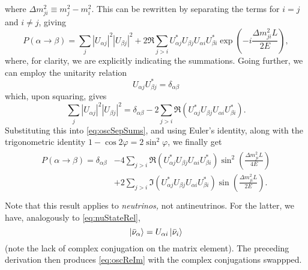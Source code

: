 \documentclass[../thesis.tex]{subfiles}
\begin{document}
where \(\Delta m^2_{ji} \equiv m^2_j - m^2_i\). This can be rewritten by separating the terms for \(i = j\) and \(i \neq j\), giving
\begin{equation}
  \label{eq:oscSepSums}
  P(\alpha \rightarrow \beta) = \sum_{j} |U_{\alpha j}|^2 |U_{\beta j}|^2
  + 2 \Re \sum_{j>i} U^*_{\alpha j} U_{\beta j} U_{\alpha i} U^*_{\beta i}
  \exp\left( -i \frac{\Delta m^2_{ji}L}{2E} \right),
\end{equation}
where, for clarity, we are explicitly indicating the summations. Going further, we can employ the unitarity relation
\begin{equation*}
  U_{\alpha j} U^*_{\beta j} = \delta_{\alpha \beta}
\end{equation*}
which, upon squaring, gives
\begin{equation*}
  \sum_j |U_{\alpha j}|^2 |U_{\beta j}|^2 = \delta_{\alpha \beta}
  - 2 \sum_{j > i} \Re(U^*_{\alpha j} U_{\beta j} U_{\alpha i} U^*_{\beta i}).
\end{equation*}
Substituting this into \eqref{eq:oscSepSums}, and using Euler's identity, along with the trigonometric identity \(1 - \cos 2\varphi = 2\sin^2 \varphi\), we finally get
\begin{align}
  \label{eq:oscReIm}
  \begin{split}
    P(\alpha \rightarrow \beta) = \delta_{\alpha \beta} &- 4\sum_{j > i} \Re(U^*_{\alpha j} U_{\beta j} U_{\alpha i} U^*_{\beta i})
    \sin^2 \left( \frac{\Delta m^2_{ji}L}{4E} \right) \\
    &+ 2\sum_{j > i} \Im(U^*_{\alpha j} U_{\beta j} U_{\alpha i} U^*_{\beta i})
    \sin \left( \frac{\Delta m^2_{ji}L}{2E} \right). \\
  \end{split}
\end{align}
Note that this result applies to \emph{neutrinos,} not antineutrinos. For the latter, we have, analogously to \eqref{eq:nuStateRel},
\begin{equation*}
  \ket{\bar\nu_\alpha} = U_{\alpha i}\ket{\bar\nu_i}
\end{equation*}
(note the lack of complex conjugation on the matrix element). The preceding derivation then produces \eqref{eq:oscReIm} with the complex conjugations swappped.
\end{document}
